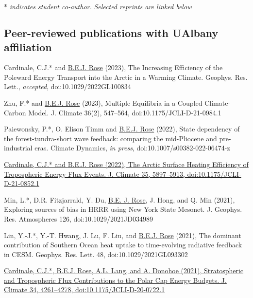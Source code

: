 \documentclass[11pt, letterpaper]{article} %
\newcommand{\years}[1]{\marginnote{\scriptsize #1}} %
\newcommand{\publink}{http://www.atmos.albany.edu/facstaff/brose/resources/Publications/}
\begin{document}
* \emph{indicates student co-author.} \emph{Selected reprints are linked below}

\subsection*{Peer-reviewed publications with UAlbany affiliation}  

\years{2023}
Cardinale, C.J.* and \underline{B.E.J. Rose} (2023), The Increasing Efficiency of the Poleward Energy Transport into the Arctic in a Warming Climate. Geophys. Res. Lett., \emph{accepted}, doi:10.1029/2022GL100834

Zhu, F.* and \underline{B.E.J. Rose} (2023), Multiple Equilibria in a Coupled Climate-Carbon Model. J. Climate 36(2), 547--564, doi:10.1175/JCLI-D-21-0984.1
\vspace{0.2 cm} 

\years{2022}
Paiewonsky, P.*, O. Elison Timm and \underline{B.E.J. Rose} (2022), State dependency of the forest-tundra-short wave feedback: comparing the mid-Pliocene and pre-industrial eras. Climate Dynamics, \emph{in press}, doi:10.1007/s00382-022-06474-z
\vspace{0.2 cm}

\href{\publink Cardinale_Rose_JClim2022accepted.pdf}{Cardinale, C.J.* and \underline{B.E.J. Rose} (2022), The Arctic Surface Heating Efficiency of Tropospheric Energy Flux Events. J. Climate 35, 5897--5913, doi:10.1175/JCLI-D-21-0852.1}
\vspace{0.2 cm} 

\years{2021}
Min, L.*, D.R. Fitzjarrald, Y. Du, \underline{B.E. J. Rose}, J. Hong, and Q. Min (2021), Exploring sources of bias in HRRR using New York State Mesonet. J. Geophys. Res. Atmospheres 126, doi:10.1029/2021JD034989
\vspace{0.2 cm}

Lin, Y.-J.*, Y.-T. Hwang, J. Lu, F. Liu, and \underline{B.E.J. Rose} (2021), The dominant contribution of Southern Ocean heat uptake to time-evolving radiative feedback in CESM. Geophys. Res. Lett. 48, doi:10.1029/2021GL093302
\vspace{0.2 cm}

\href{\publink Cardinale_etal_JClim2021.pdf}{Cardinale, C.J.*, \underline{B.E.J. Rose}, A.L. Lang, and A. Donohoe (2021), Stratospheric and Tropospheric Flux Contributions to the Polar Cap Energy Budgets. J. Climate 34, 4261--4278, doi:10.1175/JCLI-D-20-0722.1}
\vspace{0.2 cm}
\end{document}
